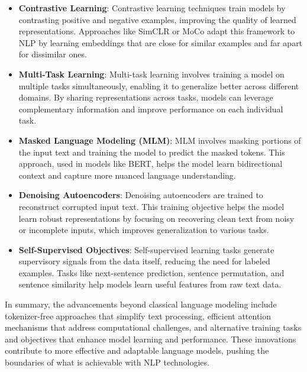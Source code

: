 \begin{itemize}
    \item \textbf{Contrastive Learning}: Contrastive learning techniques train models by contrasting positive and negative examples, improving the quality of learned representations. Approaches like SimCLR or MoCo adapt this framework to NLP by learning embeddings that are close for similar examples and far apart for dissimilar ones.

    \item \textbf{Multi-Task Learning}: Multi-task learning involves training a model on multiple tasks simultaneously, enabling it to generalize better across different domains. By sharing representations across tasks, models can leverage complementary information and improve performance on each individual task.

    \item \textbf{Masked Language Modeling (MLM)}: MLM involves masking portions of the input text and training the model to predict the masked tokens. This approach, used in models like BERT, helps the model learn bidirectional context and capture more nuanced language understanding.

    \item \textbf{Denoising Autoencoders}: Denoising autoencoders are trained to reconstruct corrupted input text. This training objective helps the model learn robust representations by focusing on recovering clean text from noisy or incomplete inputs, which improves generalization to various tasks.

    \item \textbf{Self-Supervised Objectives}: Self-supervised learning tasks generate supervisory signals from the data itself, reducing the need for labeled examples. Tasks like next-sentence prediction, sentence permutation, and sentence similarity help models learn useful features from raw text data.

\end{itemize}

In summary, the advancements beyond classical language modeling include tokenizer-free approaches that simplify text processing, efficient attention mechanisms that address computational challenges, and alternative training tasks and objectives that enhance model learning and performance. These innovations contribute to more effective and adaptable language models, pushing the boundaries of what is achievable with NLP technologies.
